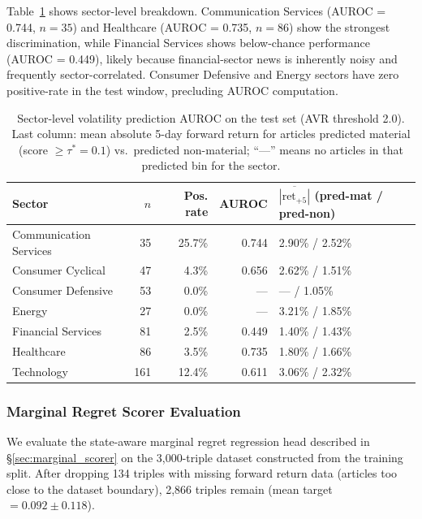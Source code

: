 \documentclass{article}
\begin{document}
Table~\ref{tab:vol_sector} shows sector-level breakdown.
Communication Services (AUROC = 0.744, $n=35$) and Healthcare (AUROC = 0.735, $n=86$) show the strongest discrimination, while Financial Services shows below-chance performance (AUROC = 0.449), likely because financial-sector news is inherently noisy and frequently sector-correlated.
Consumer Defensive and Energy sectors have zero positive-rate in the test window, precluding AUROC computation.

\begin{table}[t]
\centering
\caption{Sector-level volatility prediction AUROC on the test set (AVR threshold 2.0). Last column: mean absolute 5-day forward return for articles predicted material (score $\geq \tau^*{=}0.1$) vs.\ predicted non-material; ``---'' means no articles in that predicted bin for the sector.}
\label{tab:vol_sector}
\small
\begin{tabular}{@{}lrrrl@{}}
\toprule
\textbf{Sector} & \textbf{$n$} & \textbf{Pos. rate} & \textbf{AUROC} & \textbf{$\overline{|\mathrm{ret}_{+5}|}$ (pred-mat / pred-non)} \\
\midrule
Communication Services & 35  & 25.7\% & 0.744 & 2.90\% / 2.52\% \\
Consumer Cyclical      & 47  & 4.3\%  & 0.656 & 2.62\% / 1.51\% \\
Consumer Defensive     & 53  & 0.0\%  & ---   & --- / 1.05\% \\
Energy                 & 27  & 0.0\%  & ---   & 3.21\% / 1.85\% \\
Financial Services     & 81  & 2.5\%  & 0.449 & 1.40\% / 1.43\% \\
Healthcare             & 86  & 3.5\%  & 0.735 & 1.80\% / 1.66\% \\
Technology             & 161 & 12.4\% & 0.611 & 3.06\% / 2.32\% \\
\bottomrule
\end{tabular}
\end{table}

\subsubsection{Marginal Regret Scorer Evaluation}
\label{sec:marginal_results}

We evaluate the state-aware marginal regret regression head described in \S\ref{sec:marginal_scorer} on the 3{,}000-triple dataset constructed from the training split.
After dropping 134 triples with missing forward return data (articles too close to the dataset boundary), 2{,}866 triples remain (mean target $= 0.092 \pm 0.118$).
\end{document}
